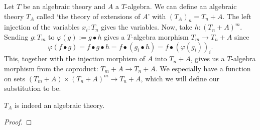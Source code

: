\begin{definition}
  Let $ T $ be an algebraic theory and $ A $ a $ T $-algebra. We can define an algebraic theory $ T_A $ called `the theory of extensions of $ A $' with $ (T_A)_n = T_n + A $. The left injection of the variables $ x_i : T_n $ gives the variables.
  Now, take $ h: (T_n + A)^m $. Sending $ g: T_m $ to $ \varphi(g) := g \bullet h $ gives a $ T $-algebra morphism $ T_m \to T_n + A $ since
  \[ \varphi(f \bullet g) = f \bullet g \bullet h = f \bullet (g_i \bullet h) = f \bullet (\varphi(g_i))_i. \]
  This, together with the injection morphism of $ A $ into $ T_n + A $, gives us a $ T $-algebra morphism from the coproduct: $ T_m + A \to T_n + A $. We especially have a function on sets $ (T_m + A) \times (T_n + A)^m \to T_n + A $, which we will define our substitution to be.
\end{definition}

\begin{lemma}
  $ T_A $ is indeed an algebraic theory.
\end{lemma}
\begin{proof}
  \TODO
\end{proof}
